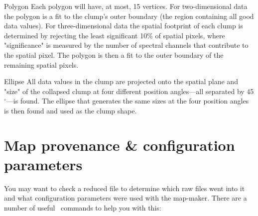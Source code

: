 \begin{aligndesc}
\item[Polygon] Each polygon will have, at most, 15 vertices. For
  two-dimensional data the polygon is a fit to the clump's outer
  boundary (the region containing all good data values). For
  three-dimensional data the spatial footprint of each clump is
  determined by rejecting the least significant 10\% of spatial
  pixels, where "significance" is measured by the number of spectral
  channels that contribute to the spatial pixel. The polygon is then a
  fit to the outer boundary of the remaining spatial pixels.

\item[Ellipse] All data values in the clump are projected onto the
  spatial plane and "size" of the collapsed clump at four different
  position angles---all separated by 45$^\circ$---is found. The
  ellipse that generates the same sizes at the four position angles is
  then found and used as the clump shape.
\end{aligndesc}



\section{Map provenance \& configuration parameters}
\label{sec:prov}

You may want to check a reduced file to determine which raw files went
into it and what configuration parameters were used with the
map-maker. There are a number of useful \Kappa\ commands to help you
with this:

